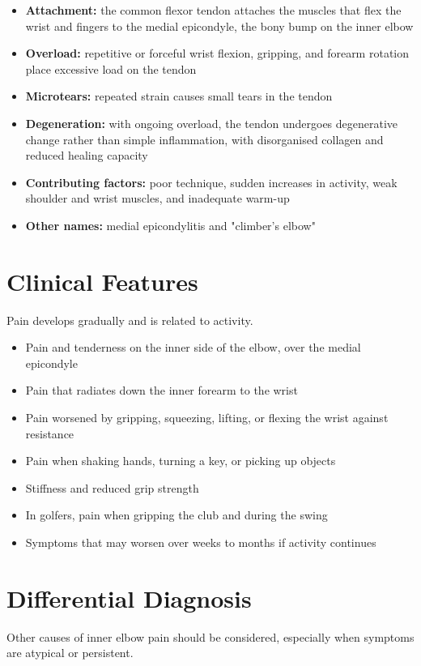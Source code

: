 \begin{itemize}
    \item \textbf{Attachment:} the common flexor tendon attaches the muscles that flex the wrist and fingers to the medial epicondyle, the bony bump on the inner elbow
    \item \textbf{Overload:} repetitive or forceful wrist flexion, gripping, and forearm rotation place excessive load on the tendon
    \item \textbf{Microtears:} repeated strain causes small tears in the tendon
    \item \textbf{Degeneration:} with ongoing overload, the tendon undergoes degenerative change rather than simple inflammation, with disorganised collagen and reduced healing capacity
    \item \textbf{Contributing factors:} poor technique, sudden increases in activity, weak shoulder and wrist muscles, and inadequate warm-up
    \item \textbf{Other names:} medial epicondylitis and "climber's elbow"
\end{itemize}

\section*{Clinical Features}
Pain develops gradually and is related to activity.

\begin{itemize}
    \item Pain and tenderness on the inner side of the elbow, over the medial epicondyle
    \item Pain that radiates down the inner forearm to the wrist
    \item Pain worsened by gripping, squeezing, lifting, or flexing the wrist against resistance
    \item Pain when shaking hands, turning a key, or picking up objects
    \item Stiffness and reduced grip strength
    \item In golfers, pain when gripping the club and during the swing
    \item Symptoms that may worsen over weeks to months if activity continues
\end{itemize}

\section*{Differential Diagnosis}
Other causes of inner elbow pain should be considered, especially when symptoms are atypical or persistent.

